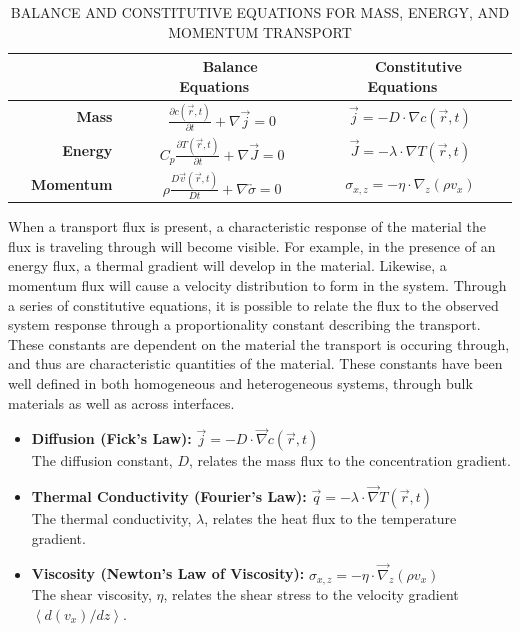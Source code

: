 \begin{table}
	\caption{BALANCE AND CONSTITUTIVE EQUATIONS FOR MASS, ENERGY, AND MOMENTUM TRANSPORT\label{tab:transport}}
        \begin{tabular}{rcc}
          \hline \hline
          & \textbf{~~Balance Equations~~} & \textbf{~~Constitutive Equations~~}\\ \hline 
          \textbf{~~Mass~~} & $\frac{\partial c (\vec{r}, t)}{\partial t} + \nabla \vec{j} = 0$ & $\vec{j} = -D \cdot \nabla c(\vec{r}, t)$\\
          \textbf{~~Energy~~} & $C_p \frac{\partial T (\vec{r}, t)}{\partial t} + \nabla \vec{J} = 0$ & $\vec{J} = -\lambda \cdot \nabla T(\vec{r}, t)$\\
          \textbf{~~Momentum~~} & $\rho \frac{D \vec{v}(\vec{r}, t)}{Dt}
                                  + \nabla \overleftrightarrow{\sigma} =
                                  0$ & $\sigma_{x,z} = -\eta \cdot
                                       \nabla_z (\rho v_x)$\\ \hline
          \hline
          \end{tabular}
\end{table}

When a transport flux is present, a characteristic response of the
material the flux is traveling through will become visible. For
example, in the presence of an energy flux, a thermal gradient will
develop in the material. Likewise, a momentum flux will cause a
velocity distribution to form in the system. Through a series of
constitutive equations, it is possible to relate the flux to the
observed system response through a proportionality constant describing
the transport. These constants are dependent on the material the
transport is occuring through, and thus are characteristic quantities
of the material. These constants have been well defined in both
homogeneous and heterogeneous systems, through bulk materials as well
as across interfaces.


\begin{itemize}
\item \textbf{Diffusion (Fick's Law):} $\vec{j} = -D \cdot \vec{\nabla}c(\vec{r},t)$ \vspace{0.05in}\\
The diffusion constant, $D$, relates the mass flux to the concentration gradient.
\item \textbf{Thermal Conductivity (Fourier's Law):} $\vec{q} = -\lambda \cdot \vec{\nabla} T(\vec{r},t)$ \vspace{0.05in}\\
The thermal conductivity, $\lambda$, relates the heat flux to the temperature gradient.
\item \textbf{Viscosity (Newton's Law of Viscosity):} $\sigma_{x,z} = -\eta \cdot \vec{\nabla}_z (\rho v_x)$ \vspace{0.05in}\\
The shear viscosity, $\eta$, relates the shear stress to the velocity gradient $\left < d(v_x)/dz \right >$.
\end{itemize}

